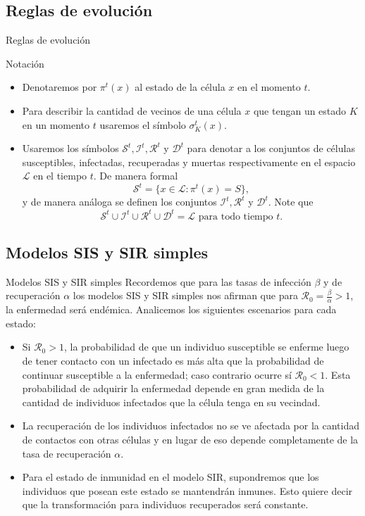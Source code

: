 \documentclass[9pt]{beamer}
\begin{document}
\subsection{Reglas de evolución}
\begin{frame}{Reglas de evolución}
\begin{alertblock}{Notación}
\begin{itemize}
    \item Denotaremos por $\pi^t(x)$ al estado de la célula $x$ en el momento $t$.
    \item Para describir la cantidad de vecinos de una célula $x$ que tengan un estado $K$ en un momento $t$ usaremos el símbolo $\sigma_K^t(x)$.
    \item Usaremos los símbolos $\mathcal{S}^t,\mathcal{I}^t,\mathcal{R}^t$ y $\mathcal{D}^t$ para denotar a los conjuntos de células susceptibles, infectadas, recuperadas y muertas respectivamente en el espacio $\mathcal{L}$ en el tiempo $t$. De manera formal
    $$\mathcal{S}^t=\{x\in\mathcal{L}:\pi^t(x)=S\},$$
    y de manera análoga se definen los conjuntos $\mathcal{I}^t,\mathcal{R}^t$ y $\mathcal{D}^t$. Note que $$\mathcal{S}^t\cup\mathcal{I}^t\cup\mathcal{R}^t\cup\mathcal{D}^t=\mathcal{L}\text{ para todo tiempo }t.$$
\end{itemize}
\end{alertblock}
\end{frame}

\subsection{Modelos SIS y SIR simples}
\begin{frame}{Modelos SIS y SIR simples}
Recordemos que para las tasas de infección $\beta$ y de recuperación $\alpha$ los modelos SIS y SIR simples nos afirman que para $\mathcal{R}_0=\frac{\beta}{\alpha}>1$, la enfermedad será endémica. Analicemos los siguientes escenarios para cada estado:

\begin{itemize}
    \item Si $\mathcal{R}_0>1$, la probabilidad de que un individuo susceptible se enferme luego de tener contacto con un infectado es más alta que la probabilidad de continuar susceptible a la enfermedad; caso contrario ocurre sí $\mathcal{R}_0<1$. Esta probabilidad de adquirir la enfermedad depende en gran medida de la cantidad de individuos infectados que la célula tenga en su vecindad. 
    
    \item La recuperación de los individuos infectados no se ve afectada por la cantidad de contactos con otras células y en lugar de eso depende completamente de la tasa de recuperación $\alpha$.
    
    \item Para el estado de inmunidad en el modelo SIR, supondremos que los individuos que posean este estado se mantendrán inmunes. Esto quiere decir que la transformación para individuos recuperados será constante.
\end{itemize}
\end{frame}
\end{document}
